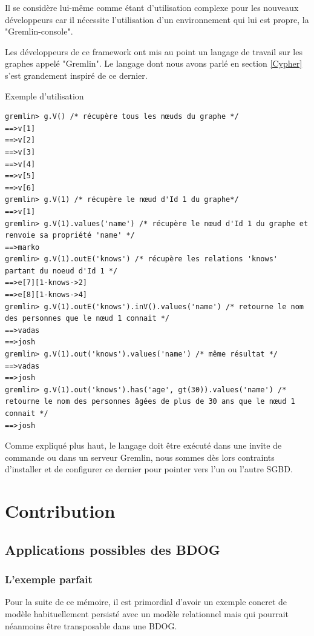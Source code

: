 \documentclass[a4paper,fleqn,12pt]{report}
\begin{document}
Il se considère lui-même comme étant d’utilisation complexe pour les nouveaux développeurs car il nécessite l’utilisation d’un environnement qui lui est propre, la "Gremlin-console".

Les développeurs de ce framework ont mis au point un langage de travail sur les graphes appelé "Gremlin". Le langage dont nous avons parlé en section \ref{Cypher} s’est grandement inspiré de ce dernier.\cite{tinkerPopSite}

Exemple d’utilisation

\begin{lstlisting}
gremlin> g.V() /* récupère tous les nœuds du graphe */
==>v[1]
==>v[2]
==>v[3]
==>v[4]
==>v[5]
==>v[6]
gremlin> g.V(1) /* récupère le nœud d'Id 1 du graphe*/
==>v[1]
gremlin> g.V(1).values('name') /* récupère le nœud d'Id 1 du graphe et renvoie sa propriété 'name' */
==>marko
gremlin> g.V(1).outE('knows') /* récupère les relations 'knows' partant du noeud d'Id 1 */
==>e[7][1-knows->2]
==>e[8][1-knows->4]
gremlin> g.V(1).outE('knows').inV().values('name') /* retourne le nom des personnes que le nœud 1 connait */
==>vadas
==>josh
gremlin> g.V(1).out('knows').values('name') /* même résultat */
==>vadas
==>josh
gremlin> g.V(1).out('knows').has('age', gt(30)).values('name') /* retourne le nom des personnes âgées de plus de 30 ans que le nœud 1 connait */
==>josh
\end{lstlisting}

Comme expliqué plus haut, le langage doit être exécuté dans une invite de commande ou dans un serveur Gremlin, nous sommes dès lors contraints d’installer et de configurer ce dernier pour pointer vers l’un ou l’autre SGBD.



\part{Contribution}
\chapter{Applications possibles des BDOG}

\section{L'exemple parfait}

Pour la suite de ce mémoire, il est primordial d'avoir un exemple concret de modèle habituellement persisté avec un modèle relationnel mais qui pourrait néanmoins être transposable dans une BDOG.
\end{document}
